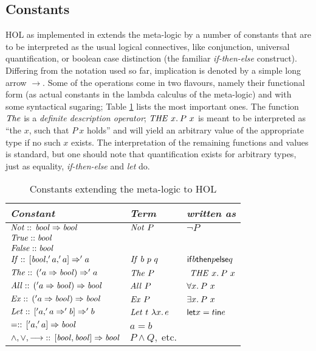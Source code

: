 \subsection{Constants}
\label{sec:hol-constants}

HOL as implemented in \Isabelle extends the meta-logic by a number of constants
that are to be interpreted as the usual logical connectives, like conjunction,
universal quantification, or boolean case distinction (the familiar
\emph{if-then-else} construct). Differing from the notation used so far,
implication is denoted by a simple long arrow $\longrightarrow$. Some of the operations come
in two flavours, namely their functional form (as actual constants in the lambda
calculus of the meta-logic) and with some syntactical sugaring; Table
\ref{tab:hol-const-typ} lists the most important ones. The function $\mathit{The}$
is a \emph{definite description operator}; $\mathit{THE}~x.\: P\ x$ is meant to be
interpreted as ``the $x$, such that $P\ x$ holds'' and will yield an arbitrary
value of the appropriate type if no such $x$ exists.  The interpretation of the
remaining functions and values is standard, but one should note that
quantification exists for arbitrary types, just as equality, \emph{if-then-else}
and \emph{let} do.
\begin{table}
  \centering \renewcommand{\arraystretch}{1.3}
  \begin{tabular}{|l|l|l|}\hline
    \emph{Constant}       & \emph{Term} & \emph{written as}\\\hline
    $\mathit{Not}::\, \mathit{bool} \Rightarrow \mathit{bool}$ & $\Fun{Not}\ P$ & $\lnot
      P$\\\hline
    $\mathit{True} :: \mathit{bool}$ & &\\\hline
    $\mathit{False} :: \mathit{bool}$ & &\\\hline
    $\mathit{If} ::\, [\mathit{bool}, 'a, 'a] \Rightarrow 'a$ & $\Fun{If}\ b\ p\ q$ &
      $\mathsf{if} b\mathsf{then} p \mathsf{else} q$\\\hline
    $\mathit{The} ::\, ('a \Rightarrow \mathit{bool}) \Rightarrow 'a$ & 
      $\Fun{The}\ P$ & $\ \mathit{THE}~ x.\: P\ x$\\\hline
    $\mathit{All}::\, ('a \Rightarrow \mathit{bool}) \Rightarrow \mathit{bool}$ &
      $\Fun{All}\ P$ & $\forall x.\: P\ x$\\\hline
    $\mathit{Ex}::\, ('a \Rightarrow \mathit{bool}) \Rightarrow \mathit{bool}$ &
      $\Fun{Ex}\ P$ & $\exists x.\: P\ x$\\\hline
    $\mathit{Let}::\, ['a, 'a \Rightarrow 'b] \Rightarrow 'b$ & 
      $\Fun{Let}\ t\ \LambdaTerm{x}{e}$ & $\mathsf{let} x = t \mathsf{in} e$\\\hline
    $= ::\, ['a, 'a] \Rightarrow \mathit{bool}$ & 
      $a = b$ & \\\hline
    $\land, \lor, \longrightarrow\; ::\, [\mathit{bool}, \mathit{bool}] \Rightarrow \mathit{bool}$ &
      $P \land Q,\; \text{etc.}$ &\\\hline
  \end{tabular}
  \caption{Constants extending the meta-logic to HOL}
  \label{tab:hol-const-typ}
\end{table}

